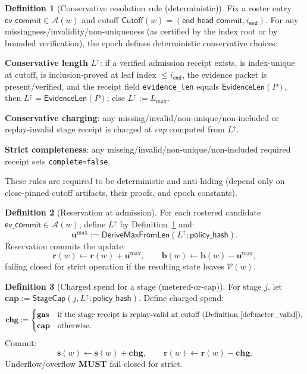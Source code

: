 \documentclass[11pt]{article}
\newcommand{\MUST}{\textbf{MUST}}
\newcommand{\code}[1]{\texttt{#1}}
\newcommand{\1}{\mathbf{1}}
\theoremstyle{definition}
\newtheorem{definition}{Definition}
\theoremstyle{plain}
\begin{document}
\begin{definition}[Conservative resolution rule (deterministic)]
\label{def:conservative_resolution}
Fix a roster entry $\textsf{ev\_commit}\in\mathcal{A}(w)$ and cutoff $\textsf{Cutoff}(w)=(\textsf{end\_head\_commit}, i_{\textsf{end}})$.
For any missingness/invalidity/non-uniqueness (as certified by the index root or by bounded verification), the epoch defines deterministic conservative choices:
\begin{tightitemize}
\item \textbf{Conservative length} $L^\uparrow$: if a verified admission receipt exists, is index-unique at cutoff, is inclusion-proved at leaf index $\le i_{\textsf{end}}$, the evidence packet is present/verified, and the receipt field \code{evidence\_len} equals $\mathsf{EvidenceLen}(P)$, then $L^\uparrow=\mathsf{EvidenceLen}(P)$; else $L^\uparrow:=L_{\max}$.
\item \textbf{Conservative charging}: any missing/invalid/non-unique/non-included or replay-invalid stage receipt is charged at \emph{cap} computed from $L^\uparrow$.
\item \textbf{Strict completeness}: any missing/invalid/non-unique/non-included required receipt sets \code{complete=false}.
\end{tightitemize}
These rules are required to be deterministic and anti-hiding (depend only on close-pinned cutoff artifacts, their proofs, and epoch constants).
\end{definition}

\begin{definition}[Reservation at admission]
\label{def:reserve}
For each rostered candidate $\textsf{ev\_commit}\in\mathcal{A}(w)$, define $L^\uparrow$ by Definition~\ref{def:conservative_resolution} and:
\[
\mathbf{u}^{\max}:=\mathsf{DeriveMaxFromLen}(L^\uparrow;\textsf{policy\_hash}).
\]
Reservation commits the update:
\[
\mathbf{r}(w)\leftarrow \mathbf{r}(w)+\mathbf{u}^{\max},\qquad
\mathbf{b}(w)\leftarrow \mathbf{b}(w)-\mathbf{u}^{\max},
\]
failing closed for strict operation if the resulting state leaves $\mathcal{V}(w)$.
\end{definition}

\begin{definition}[Charged spend for a stage (metered-or-cap)]
\label{def:charged_stage}
For stage $j$, let $\mathbf{cap}:=\mathsf{StageCap}(j,L^\uparrow;\textsf{policy\_hash})$.
Define charged spend:
\[
\mathbf{chg}:=
\begin{cases}
\mathbf{gas} & \text{if the stage receipt is replay-valid at cutoff (Definition~\ref{def:meter_valid})},\\
\mathbf{cap} & \text{otherwise}.
\end{cases}
\]
Commit:
\[
\mathbf{s}(w)\leftarrow \mathbf{s}(w)+\mathbf{chg},\qquad
\mathbf{r}(w)\leftarrow \mathbf{r}(w)-\mathbf{chg}.
\]
Underflow/overflow \MUST{} fail closed for strict.
\end{definition}
\end{document}
